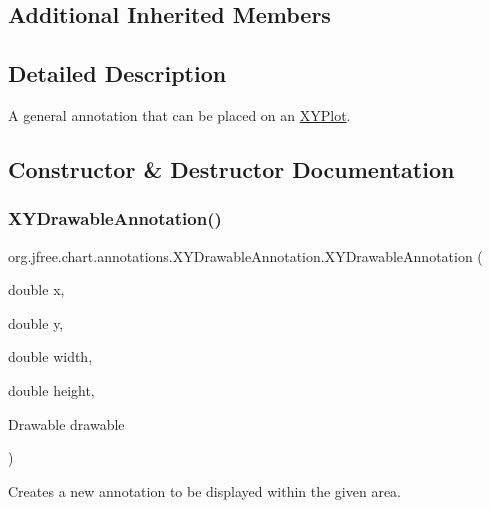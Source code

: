 \subsection*{Additional Inherited Members}


\subsection{Detailed Description}
A general annotation that can be placed on an \mbox{\hyperlink{}{X\+Y\+Plot}}. 

\subsection{Constructor \& Destructor Documentation}
\mbox{\label{classorg_1_1jfree_1_1chart_1_1annotations_1_1_x_y_drawable_annotation_a15862458ab908eaadfb6d658fefe212d}} 
\subsubsection{\texorpdfstring{X\+Y\+Drawable\+Annotation()}{XYDrawableAnnotation()}\hspace{0.1cm}{\footnotesize\ttfamily [1/2]}}
{\footnotesize\ttfamily org.\+jfree.\+chart.\+annotations.\+X\+Y\+Drawable\+Annotation.\+X\+Y\+Drawable\+Annotation (\begin{DoxyParamCaption}\item[{double}]{x,  }\item[{double}]{y,  }\item[{double}]{width,  }\item[{double}]{height,  }\item[{Drawable}]{drawable }\end{DoxyParamCaption})}

Creates a new annotation to be displayed within the given area.


